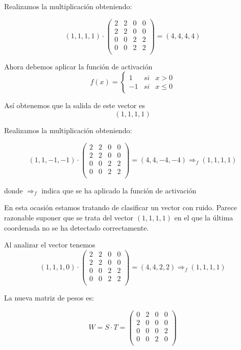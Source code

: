 \begin{problem}[8]
\spart

Realizamos la multiplicación obteniendo:

\[(1,1,1,1) \cdot \left( \begin{array}{cccc}
2 & 2 & 0 & 0 \\
2 & 2 & 0 & 0 \\
0 & 0 & 2 & 2 \\
0 & 0 & 2 & 2 \\
\end{array}\right) = (4,4,4,4)\]

Ahora debemos aplicar la función de activación
\[f(x) = \left\{\begin{array}{lll}1 & si & x>0 \\ -1 & si & x \leq 0 \end{array} \right.\]

Así obtenemos que la salida de este vector es
\[(1,1,1,1)\]

\spart

Realizamos la multiplicación obteniendo:

\[(1,1,-1,-1) \cdot \left( \begin{array}{cccc}
2 & 2 & 0 & 0 \\
2 & 2 & 0 & 0 \\
0 & 0 & 2 & 2 \\
0 & 0 & 2 & 2 \\
\end{array}\right) = (4,4,-4,-4) \Rightarrow_f (1,1,1,1)\]

donde $\Rightarrow_f$ indica que se ha aplicado la función de activación

\spart

En esta ocasión estamos tratando de clasificar un vector con ruido. Parece razonable suponer que se trata del vector $(1,1,1,1)$ en el que la última coordenada no se ha detectado correctamente.

Al analizar el vector tenemos
\[(1,1,1,0) \cdot \left( \begin{array}{cccc}
2 & 2 & 0 & 0 \\
2 & 2 & 0 & 0 \\
0 & 0 & 2 & 2 \\
0 & 0 & 2 & 2 \\
\end{array}\right) = (4,4,2,2) \Rightarrow_f (1,1,1,1)\]

\spart

La nueva matriz de pesos es:

\[W = S\cdot T = \left( \begin{array}{cccc}
0 & 2 & 0 & 0 \\
2 & 0 & 0 & 0 \\
0 & 0 & 0 & 2 \\
0 & 0 & 2 & 0 \\
\end{array}\right)\]


\end{problem}
